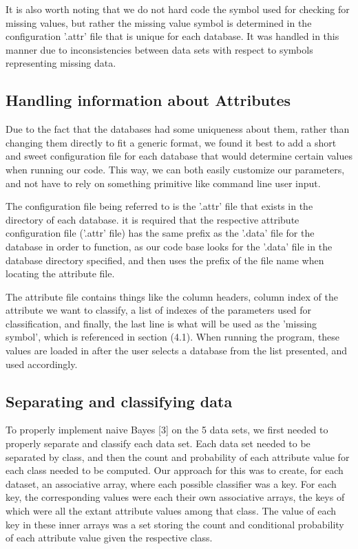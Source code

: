 \documentclass[twoside,11pt]{article}
\begin{document}
It is also worth noting that we do not hard code the symbol used for checking for missing values, but rather the missing value symbol is determined in the configuration '.attr' file that is unique for each database. It was handled in this manner due to inconsistencies between data sets with respect to symbols representing missing data.

\subsection{Handling information about Attributes}
Due to the fact that the databases had some uniqueness about them, rather than changing them directly to fit a generic format, we found it best to add a short and sweet configuration file for each database that would determine certain values when running our code. This way, we can both easily customize our parameters, and not have to rely on something primitive like command line user input. 

The configuration file being referred to is the '.attr' file that exists in the directory of each database. it is required that the respective attribute configuration file ('.attr' file) has the same prefix as the '.data' file for the database in order to function, as our code base looks for the '.data' file in the database directory specified, and then uses the prefix of the file name when locating the attribute file. 

The attribute file contains things like the column headers, column index of the attribute we want to classify, a list of indexes of the parameters used for classification, and finally, the last line is what will be used as the 'missing symbol', which is referenced in section (4.1). When running the program, these values are loaded in after the user selects a database from the list presented, and used accordingly.

\subsection{Separating and classifying data}
To properly implement naive Bayes [3] on the 5 data sets, we first needed to properly separate and classify each data set. Each data set needed to be separated by class, and then the count and probability of each attribute value for each class needed to be computed. Our approach for this was to create, for each dataset, an associative array, where each possible classifier was a key. For each key, the corresponding values were each their own associative arrays, the keys of which were all the extant attribute values among that class. The value of each key in these inner arrays was a set storing the count and conditional probability of each attribute value given the respective class. \\ \\
\end{document}

